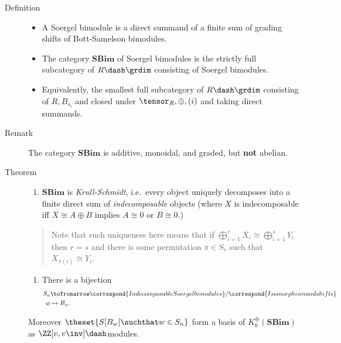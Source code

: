\begin{description}
\item[Definition]
\hfill

\begin{itemize}
\tightlist
\item
  A Soergel bimodule is a direct summand of a finite sum of grading
  shifts of Bott-Samelson bimodules.
\item
  The category \(\mathbf{SBim}\) of Soergel bimodules is the strictly
  full subcategory of \(R\dash\grdim\) consisting of Soergel bimodules.
\item
  Equivalently, the smallest full subcategory of \(R\dash\grdim\)
  consisting of \(R, B_{s_i}\) and closed under
  \(\tensor_R, \oplus, (i)\) and taking direct summands.
\end{itemize}
\item[Remark]
The category \(\mathbf{SBim}\) is additive, monoidal, and graded, but
\textbf{not} abelian.
\item[Theorem]
\hfill

\begin{enumerate}
\def\labelenumi{\arabic{enumi}.}
\tightlist
\item
  \(\mathbf{SBim}\) is \emph{Krull-Schmidt}, i.e.~every object uniquely
  decomposes into a finite direct sum of \emph{indecomposable} objects
  (where \(X\) is indecomposable iff \(X \cong A\oplus B\) implies
  \(A\cong 0\) or \(B\cong 0\).)
\end{enumerate}

\begin{quote}
Note that such uniqueness here means that if
\(\bigoplus_{i=1}^r X_i \cong \bigoplus_{i=1}^s Y_i\) then \(r=s\) and
there is some permutation \(\pi \in S_r\) such that
\(X_{\pi(i)} \cong Y_i\).
\end{quote}

\begin{enumerate}
\def\labelenumi{\arabic{enumi}.}
\setcounter{enumi}{1}
\tightlist
\item
  There is a bijection \begin{align*}
  S_n &\tofromarrow \correspond{Indecomposable Soergel bimodules}/\correspond{Isomorphism and shifts} \\
  w &\mapsto B_w
  .\end{align*}
\end{enumerate}

Moreover \(\theset{ S[B_w] \suchthat w\in S_n }\) form a basis of
\(K_0^\oplus(\mathbf{SBim})\) as \(\ZZ[v, v\inv]\dash\)modules.


\end{description}
